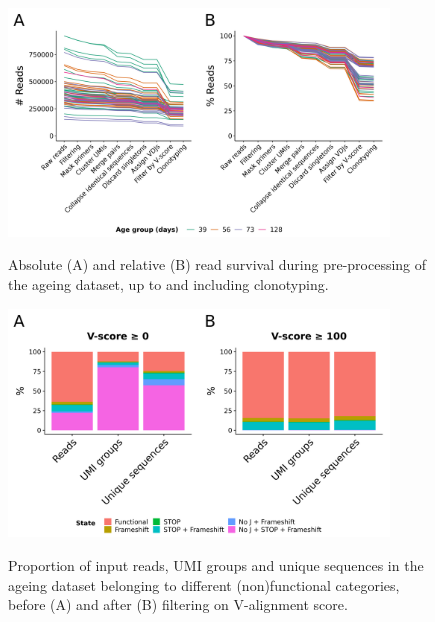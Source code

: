 \begin{figure}
\centering
\includegraphics[width = 0.9\textwidth]{_Figures/png/ageing-read-survival-all.png}
\begin{subfigure}{0em}
\label{fig:igseq-ageing-read-survival-all-abs}
\end{subfigure}
\begin{subfigure}{0em}
\label{fig:igseq-ageing-read-survival-all-rel}
\end{subfigure}
\caption{Absolute (A) and relative (B) read survival during pre-processing of the \igseq ageing dataset, up to and including clonotyping.}
\label{fig:igseq-ageing-read-survival-all}
\end{figure} %

\begin{figure}
\centering
\includegraphics[width = 0.9\textwidth]{_Figures/png/ageing-functional-prop}
\begin{subfigure}{0em}
\label{fig:igseq-ageing-functional-prop-pre}
\end{subfigure}
\begin{subfigure}{0em}
\label{fig:igseq-ageing-functional-prop-post}
\end{subfigure}
\caption{Proportion of input reads, UMI groups and unique sequences in the \igseq ageing dataset belonging to different (non)functional categories, before (A) and after (B) filtering on V-alignment score.}
\label{fig:igseq-ageing-functional-prop}
\end{figure}

